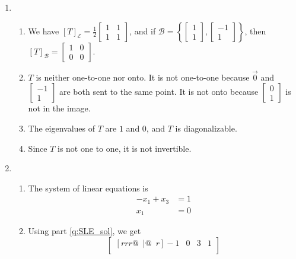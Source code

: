 \documentclass[red]{tutorial}
\newcommand{\R}{\mathbb{R}}
\newcommand{\mat}[1]{\begin{bmatrix} #1 %
\end{bmatrix}}
\newcommand{\smat}[1]{\left[\begin{smallmatrix} #1 %
\end{smallmatrix}\right]}
\theoremstyle{definition}
\theoremstyle{theorem}
\begin{document}
{\begin{solutions}
\begin{enumerate}
\begin{enumerate}
          determinant is nonzero.
        \item
          When $A$ is not invertible, $a=0$, in which case the columns of $A$
          span a $2$-dimensional subspace of $\R^3$, meaning that the rank of
          $A$ is $2$.
        \item
          One basis is given by $\left\{\mat{0\\0\\1} , \mat{1\\0\\0}\right\}$
      \end{enumerate}
      \pagebreak %
    \item
      \begin{enumerate}
        \item
          We have
          $[T]_{\mathcal{E}} = \displaystyle\frac12\mat{1&1\\1&1}$,
          and if $\mathcal{B} = \left\{\mat{1\\1},\mat{-1\\1}\right\}$,
          then $[T]_{\mathcal{B}} = \mat{1&0\\0&0}$.
        \item $T$ is neither one-to-one nor onto. It is not
          one-to-one because $\vec 0$ and $\smat{-1\\1}$ are both sent
          to the same point. It is not onto because $\smat{0\\1}$ is not
          in the image.
        \item The eigenvalues of $T$ are $1$ and $0$,
          and $T$ is diagonalizable.
        \item Since $T$ is not one to one, it is not invertible.
      \end{enumerate}
    \item
      \begin{enumerate}
        \item\label{q:SLE_sol}
          The system of linear equations is
          \begin{align*}
            -x_1 + x_3 &= 1\\
            x_1 \phantom{{} + x_3}&= 0
          \end{align*}
        \item Using part \ref{q:SLE_sol}, we get
          \begin{equation*}
            \begin{bmatrix}[rrr@{\enspace}|@{\enspace}r]
              -1 & 0 & 3 & 1 \\

\end{bmatrix}
\end{equation*}
\end{enumerate}
\end{enumerate}
\end{solutions}}
\end{document}
